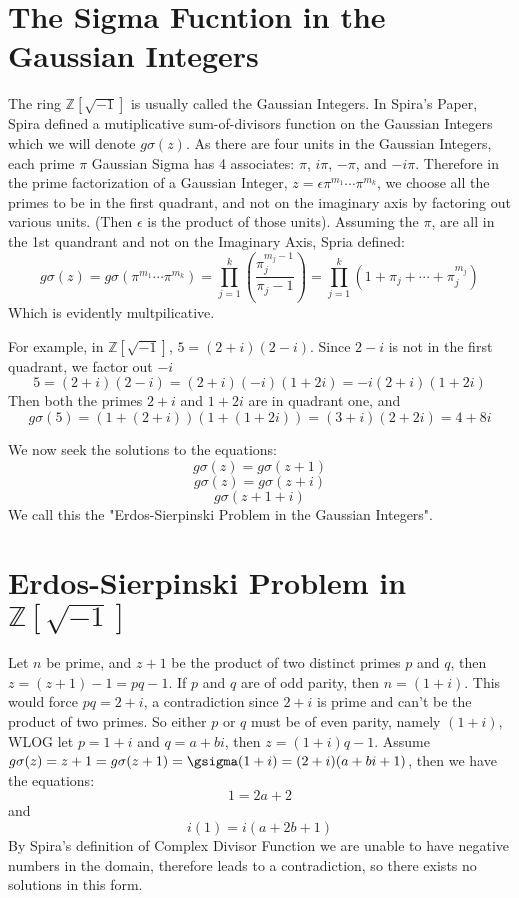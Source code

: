 \documentclass[12pt]{amsart}
\begin{document}
\section{The Sigma Fucntion in the Gaussian Integers}
	The ring $\mathds{Z}[\sqrt{-1}]$ is usually called the Gaussian Integers. In Spira's Paper, Spira defined a mutiplicative sum-of-divisors function on the Gaussian Integers which we will denote $g\sigma(z)$. As there are four units in the Gaussian Integers, each prime $\pi$ Gaussian Sigma has 4 associates: $\pi$, $i\pi$, $-\pi$, and $-i\pi$. Therefore in the prime factorization of a Gaussian Integer, $z = \epsilon\pi^{m_1}\cdots\pi^{m_k}$, we choose all the primes to be in the first quadrant, and not on the imaginary axis by factoring out various units. (Then $\epsilon$ is the product of those units). Assuming the $\pi$, are all in the 1st quandrant and not on the Imaginary Axis, Spria defined:$$g\sigma(z)=g\sigma(\pi^{m_1}\cdots\pi^{m_k}) = \prod_{j=1}^{k}\left(\frac{\pi_j^{m_j-1}} {\pi_j - 1}\right) = \prod_{j=1}^{k} \left(1 + \pi_j + \cdots + \pi_j^{m_j}\right)$$ 
Which is evidently multpilicative. 

For example, in $\mathds{Z}[\sqrt{-1}]$, $5=(2+i)(2-i)$. Since $2-i$ is not in the first quadrant, we factor out $-i$ $$5=(2+i)(2-i) = (2+i)(-i)(1+2i) = -i(2+i)(1+2i)$$ 
Then both the primes $2+i$ and $1+2i$ are in quadrant one, and $$g\sigma(5) = (1+(2+i))(1+(1+2i))
= (3+i)(2+2i) = 4+8i$$

We now seek the solutions to the equations: $$g\sigma(z) = g\sigma(z+1)$$ $$g\sigma(z) = g\sigma(z+i)$$ $$g\sigma(z+1+i)$$
We call this the "Erdos-Sierpinski Problem in the Gaussian Integers".

\section{Erdos-Sierpinski Problem in $\mathds{Z}[\sqrt{-1}]$}

Let $n$ be prime, and $z+1$ be the product of two distinct primes $p$ and $q$, then $z = (z + 1) - 1 = pq - 1$. If $p$ and $q$ are of odd parity, then $n = (1+i)$. This would force $pq = 2+i$, a contradiction since $2+i$ is prime and can't be the product of two primes. So either $p$ or $q$ must be of even parity, namely $(1+i)$, WLOG let $p = 1 + i$ and $q=a + bi$, then $z = (1+i)q - 1$. Assume $g\sigma(z) = z+1 = g\sigma(z+1) = \gsigma(1+i) = (2+i)(a + bi +1)$, then we have the equations: $$1 = 2a + 2$$ and $$i(1) = i(a + 2b + 1)$$ By Spira's definition of Complex Divisor Function we are unable to have negative numbers in the domain, therefore leads to a contradiction, so there exists no solutions in this form.
\end{document}
